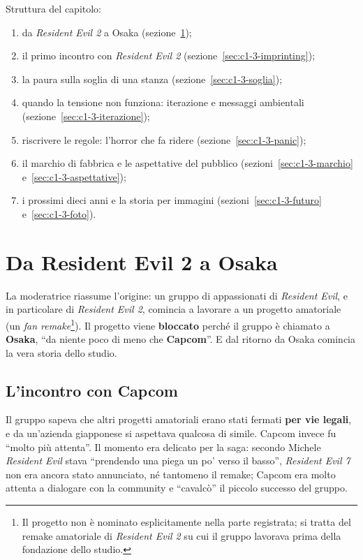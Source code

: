 Struttura del capitolo:
\begin{enumerate}
  \item da \emph{Resident Evil 2} a Osaka (sezione~\ref{sec:c1-3-capcom});
  \item il primo incontro con \emph{Resident Evil 2}
        (sezione~\ref{sec:c1-3-imprinting});
  \item la paura sulla soglia di una stanza (sezione~\ref{sec:c1-3-soglia});
  \item quando la tensione non funziona: iterazione e messaggi ambientali
        (sezione~\ref{sec:c1-3-iterazione});
  \item riscrivere le regole: l'horror che fa ridere
        (sezione~\ref{sec:c1-3-panic});
  \item il marchio di fabbrica e le aspettative del pubblico
        (sezioni~\ref{sec:c1-3-marchio} e~\ref{sec:c1-3-aspettative});
  \item i prossimi dieci anni e la storia per immagini
        (sezioni~\ref{sec:c1-3-futuro} e~\ref{sec:c1-3-foto}).
\end{enumerate}

\section{Da Resident Evil 2 a Osaka}
\label{sec:c1-3-capcom}

La moderatrice riassume l'origine: un gruppo di appassionati di
\emph{Resident Evil}, e in particolare di \emph{Resident Evil 2}, comincia a
lavorare a un progetto amatoriale (un \emph{fan remake}\footnote{Il progetto non
è nominato esplicitamente nella parte registrata; si tratta del remake
amatoriale di \emph{Resident Evil 2} su cui il gruppo lavorava prima della
fondazione dello studio.}). Il progetto viene \textbf{bloccato} perché il gruppo
è chiamato a \textbf{Osaka}, ``da niente poco di meno che \textbf{Capcom}''. E
dal ritorno da Osaka comincia la vera storia dello studio.

\subsection{L'incontro con Capcom}

Il gruppo sapeva che altri progetti amatoriali erano stati fermati \textbf{per
vie legali}, e da un'azienda giapponese si aspettava qualcosa di simile. Capcom
invece fu ``molto più attenta''. Il momento era delicato per la saga: secondo
Michele \emph{Resident Evil} stava ``prendendo una piega un po' verso il
basso'', \emph{Resident Evil 7} non era ancora stato annunciato, né tantomeno
il remake; Capcom era molto attenta a dialogare con la community e ``cavalcò''
il piccolo successo del gruppo.

